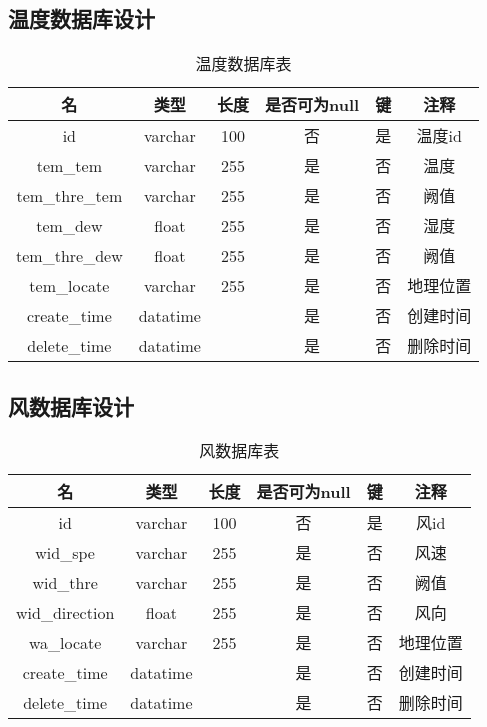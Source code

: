\subsection{温度数据库设计}
\begin{table}[H]
	\centering
	\caption[温度数据]{温度数据库表}
	\begin{tabular}{cccccc}
		\toprule
		名            & 类型      & 长度 &是否可为null & 键 & 注释\\
		\midrule
		id            & varchar  & 100  & 否 & 是 & 温度id \\
		tem\_tem     & varchar  & 255  &是  & 否 & 温度   \\
		tem\_thre\_tem      & varchar  & 255  &是  & 否 & 阙值   \\
		tem\_dew   & float    & 255  &是  & 否 & 湿度 \\
		tem\_thre\_dew     & float    & 255  &是  & 否 & 阙值   \\
		tem\_locate   & varchar    & 255  & 是 & 否 & 地理位置     \\
		create\_time  & datatime &      &是  & 否 & 创建时间   \\
		delete\_time  &datatime  &      & 是 & 否 & 删除时间   \\ 
		\bottomrule
	\end{tabular}
\end{table}

\subsection{风数据库设计}
\begin{table}[H]
	\centering
	\caption[风数据]{风数据库表}
	\begin{tabular}{cccccc}
		\toprule
		名            & 类型      & 长度 &是否可为null & 键 & 注释\\
		\midrule
		id            & varchar  & 100  & 否 & 是 & 风id \\
		wid\_spe      & varchar  & 255  &是  & 否 & 风速   \\
		wid\_thre      & varchar  & 255  &是  & 否 & 阙值   \\
		wid\_direction   & float    & 255  &是  & 否 & 风向 \\
		wa\_locate   & varchar    & 255  & 是 & 否 & 地理位置     \\
		create\_time  & datatime &      &是  & 否 & 创建时间   \\
		delete\_time  &datatime  &      & 是 & 否 & 删除时间   \\ 
		\bottomrule
	\end{tabular}
\end{table}

